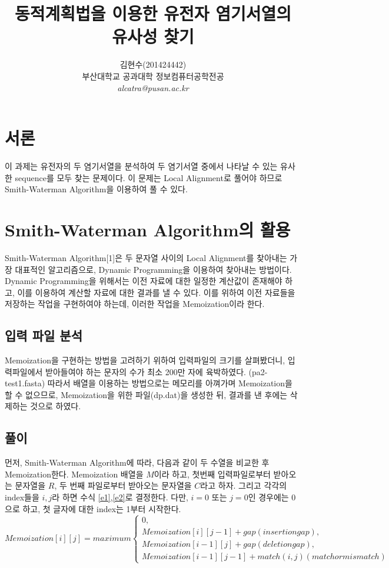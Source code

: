 \documentclass[10pt,a4paper]{article}
\title{\textbf{동적계획법을 이용한 유전자 염기서열의 유사성 찾기}}
\author{ 김현수(201424442) \\[3mm]
		 부산대학교 공과대학 정보컴퓨터공학전공 \\[3mm]
		 \textit{alcatra@pusan.ac.kr}
	   }
\begin{document}
\begin{spacing}{1.6}
\maketitle 
\tableofcontents

\section{서론}
  이 과제는 유전자의 두 염기서열을 분석하여 두 염기서열 중에서 나타날 수 있는 유사한 sequence를 모두 찾는 문제이다. 이 문제는 Local Alignment로 풀어야 하므로 Smith-Waterman Algorithm을 이용하여 풀 수 있다. 
  
\section{Smith-Waterman Algorithm의 활용}
  Smith-Waterman Algorithm[1]은 두 문자열 사이의 Local Alignment를 찾아내는 가장 대표적인 알고리즘으로, Dynamic Programming을 이용하여 찾아내는 방법이다. Dynamic Programming을 위해서는 이전 자료에 대한 일정한 계산값이 존재해야 하고, 이를 이용하여 계산할 자료에 대한 결과를 낼 수 있다. 이를 위하여 이전 자료들을 저장하는 작업을 구현하여야 하는데, 이러한 작업을 Memoization이라 한다. 

\subsection{입력 파일 분석}
  Memoization을 구현하는 방법을 고려하기 위하여 입력파일의 크기를 살펴봤더니, 입력파일에서 받아들여야 하는 문자의 수가 최소 200만 자에 육박하였다. (pa2-test1.fasta) 따라서 배열을 이용하는 방법으로는 메모리를 아껴가며 Memoization을 할 수 없으므로, Memoization을 위한 파일(dp.dat)을 생성한 뒤, 결과를 낸 후에는 삭제하는 것으로 하였다. 

\subsection{풀이}
    먼저, Smith-Waterman Algorithm에 따라, 다음과 같이 두 수열을 비교한 후 Memoization한다. Memoization 배열을 $M$이라 하고, 첫번째 입력파일로부터 받아오는 문자열을 $R$, 두 번째 파일로부터 받아오는 문자열을 $C$라고 하자. 그리고 각각의 index들을 $i,j$라 하면 수식 \ref{e1},\ref{e2}로 결정한다. 다만, $i=0$ 또는 $j=0$인 경우에는 0으로 하고, 첫 글자에 대한 index는 1부터 시작한다. 
    \begin{equation}
    Memoization[i][j] = maximum \begin{cases} 
    	0,\\
    	Memoization[i][j-1] + gap (insertion gap), \\
    	Memoization[i-1][j] + gap (deletion gap),\\
    	Memoization[i-1][j-1] + match(i,j) (match or mismatch)
    	\end{cases}
    	\label{e1}
    \end{equation}
    

\end{spacing}
\end{document}

